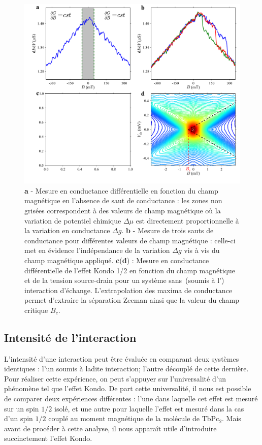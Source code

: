 \begin{figure}
\includegraphics[scale=0.45]{Resultats/AmplJump/AmplJump.pdf} 
\caption{\textbf{a} - Mesure en conductance différentielle en fonction du champ magnétique en l'absence de saut de conductance : les zones non grisées correspondent à des valeurs de champ magnétique où la variation de potentiel chimique $\Delta \mu$ est directement proportionnelle à la variation en conductance $\Delta g$. \textbf{b} - Mesure de trois sauts de conductance pour différentes valeurs de champ magnétique : celle-ci met en évidence l'indépendance de la variation $\Delta g$ vis à vis du champ magnétique appliqué. \textbf{c}(\textbf{d}) : Mesure en conductance différentielle de l'effet Kondo 1/2 en fonction du champ magnétique et de la tension source-drain pour un système sans~(soumis à l') interaction d'échange. L'extrapolation des maxima de conductance permet d'extraire la séparation Zeeman ainsi que la valeur du champ critique $B_c$.}
\label{analyse_interaction}
\end{figure}

\subsection{Intensité de l'interaction}
L'intensité d'une interaction peut être évaluée en comparant deux systèmes identiques : l'un soumis à ladite interaction; l'autre découplé de cette dernière. Pour réaliser cette expérience, on peut s'appuyer sur l'universalité d'un phénomène tel que l'effet Kondo. De part cette universalité, il nous est possible de comparer deux expériences différentes : l'une dans laquelle cet effet est mesuré sur un spin $1/2$ isolé, et une autre pour laquelle l'effet est mesuré dans la cas d'un spin $1/2$ couplé au moment magnétique de la molécule de TbPc$_2$. Mais avant de procéder à cette analyse, il nous apparaît utile d'introduire succinctement l'effet Kondo.

